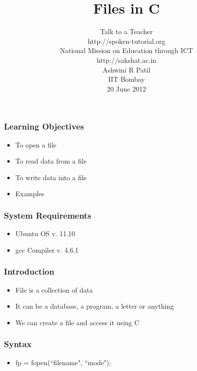 \documentclass[17pt]{beamer}
\begin{document}
\sffamily \bfseries
\title
[Files in C\hspace{0.75cm}]
{Files in C}
\author
[Ashwini R Patil]
{\small Talk to a Teacher \\http://spoken-tutorial.org \\ National Mission on Education
  through ICT \\ http://sakshat.ac.in \\ [0.6cm]
   Ashwini R Patil \\IIT Bombay \\[0.6cm]
{\small 20 June 2012}
}
\begin{frame}
   \titlepage
\end{frame}
\begin{frame}[fragile]
  \frametitle{Learning Objectives}\pause
  \begin{itemize}[<+-|alert@+>]
  \item To open a file
  \item To read data from a file
  \item To write data into a file
  \item Examples
  \end{itemize}
\end{frame}
\begin{frame}
  \frametitle {System Requirements} \pause
  \begin{itemize}[<+-|alert@+>]
  \item Ubuntu OS v. 11.10
  \item gcc Compiler v. 4.6.1
  \end{itemize}
\end{frame}


\begin{frame}
  \frametitle{Introduction}\pause
  \begin{itemize}[<+-|alert@+>]
  \item File is a collection of data
  \item It can be a database, a program, a letter or anything
  \item We can create a file and access it using C
 \end{itemize}
\end{frame}

\begin{frame}
  \frametitle{Syntax}\pause
  \begin{itemize}[<+-|alert@+>]
  \item {\color{magenta}fp = fopen(``filename", ``mode");}
  \end{itemize}
  \end{frame}
  
\end{document}

